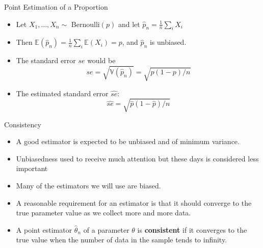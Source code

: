 \documentclass[handout]{beamer}
\begin{document}
\begin{frame}{Point Estimation of a Proportion}
\scriptsize{
\begin{itemize}
 \item Let $X_1, \dots, X_n \sim$ Bernoulli$(p)$ and let $\hat{p}_{n}=\frac 1n \sum_{i}X_{i}$
 \item Then $\mathbb{E}(\hat{p}_{n})= \frac 1n \sum_i \mathbb{E}(X_i)=p$, and $\hat{p}_n$ is unbiased.
 \item The standard error $se$ would be
\begin{displaymath}
se = \sqrt{\mathbb{V}(\hat{p}_n)}= \sqrt{p(1-p)/n} 
\end{displaymath}
\item The estimated standard error $\hat{se}$:
\begin{displaymath}
\hat{se} =\sqrt{\hat{p}(1-\hat p)/n} 
\end{displaymath}

\end{itemize}


} 
\end{frame}




\begin{frame}{Consistency}

\scriptsize{

\begin{itemize}
\item A good estimator is expected to be unbiased and of minimum variance.

\item Unbiasedness used to receive much attention but these days is considered less important

\item Many of the estimators we will use are biased. 

\item A reasonable requirement for an estimator is that it should converge to the true parameter value as we collect more and more data.

\item A point estimator $\hat{\theta}_n$ of a parameter $\theta$ is \textbf{consistent}  if it converges to the true value when the number of data in the sample tends to infinity.

\end{itemize}

} 
\end{frame}
\end{document}
